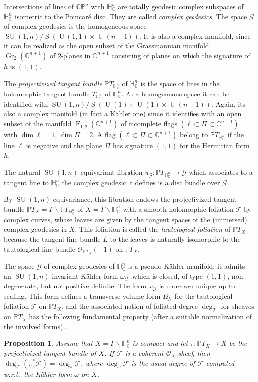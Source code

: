 \documentclass[JEP,XML,SOM,Unicode,NoFloatCountersInSection]{cedram}
\let\mathcal\mathscr
\newcommand{\citestar}[3]{\cite[#3]{#1}}
\theoremstyle{plain}
\newtheorem{prop}[theo]{Proposition}
\theoremstyle{definition}
\DeclareMathOperator{\rF}{F}
\DeclareMathOperator{\Gr}{Gr}
\DeclareMathOperator{\rS}{S}
\DeclareMathOperator{\SU}{SU}
\DeclareMathOperator{\rU}{U}
\newcommand{\cF}{\mathcal{F}}
\newcommand{\cG}{\mathcal{G}}
\newcommand{\cO}{\mathcal{O}}
\newcommand{\cT}{\mathcal{T}}
\newcommand{\bC}{\mathbb{C}}
\newcommand{\bCP}{\mathbb{CP}}
\newcommand{\HC}{{\mathbb{H}^n_\mathbb{C}}}
\newcommand{\THC}{T_{\HC}}
\newcommand{\PTX}{{\mathbb{P}T_X}}
\newcommand{\PTH}{\mathbb{P}T_{\mathbb{H}^n_\mathbb{C}}}
\newcommand{\OX}{\mathcal{O}_{\PTX}(-1)}
\begin{document}
Intersections of lines
of $\bCP^n$ with $\HC$ are totally geodesic complex subspaces of~$\HC$ isometric to the Poincaré
disc. They are called \emph{complex geodesics}. The space $\cG$ of complex geodesics is the
homogeneous space $\SU(1,n)/\rS(\rU(1,1)\times \rU(n-1))$. It is also a complex manifold, since it
can be realized as the open subset of the Grassmannian manifold $\Gr_2(\bC^{n+1})$ of
$2$-planes in $\bC^{n+1}$ consisting of planes on which the signature of $h$ is $(1,1)$.

The \emph{projectivized tangent bundle} $\PTH$ of $\HC$ is the space of lines in the holomorphic
tangent bundle $\THC$ of $\HC$. As a homogeneous space it can be identified with
$\SU(1,n)/\rS(\rU(1)\times\rU(1)\times \rU(n-1))$. Again, its also a complex manifold (in fact a Kähler one)
since it identifies with an open subset of the manifold $\rF_{1,2}(\bC^{n+1})$
of incomplete flags $(\ell\subset\Pi\subset\bC^{n+1})$ with
$\dim \ell=1$, $ \dim\Pi=2$. A flag $(\ell\subset\Pi\subset\bC^{n+1})$ belong to $\PTH$ if the line
$\ell$ is negative and the plane $\Pi$ has signature $(1,1)$ for the Hermitian form $h$.

The natural $\SU(1,n)$-equivariant fibration $\pi_{\cG}:\PTH\to\cG$ which associates
to a tangent line to $\HC$ the complex geodesic it defines is a
disc bundle over $\cG$.

By $\SU(1,n)$-equivariance, this fibration endows the projectivized tangent bundle
$\PTX=\Gamma\backslash\PTH$ of $X=\Gamma\backslash\HC$ with a smooth holomorphic foliation $\cT$ by
complex curves, whose
leaves are given by the tangent spaces of the (immersed) complex geodesics in $X$. This foliation is
called the \emph{tautological foliation} of $\PTX$ because the tangent line bundle $L$ to the leaves is
naturally isomorphic to the tautological line bundle $\OX$ on $\PTX$.

The space $\cG$ of complex geodesics of $\HC$ is a pseudo-Kähler manifold: it admits an
$\SU(1,n)$-invariant Kähler form $\omega_{\cG}$, which is closed, of type $(1,1)$, non degenerate,
but not positive definite. The form $\omega_{\cG}$ is moreover unique up to scaling. This form
defines a transverse volume form $\Omega_{\cG}$
for the tautological foliation $\cT$ on $\PTX$, and the associated notion of foliated degree
$\deg_\cT$ for sheaves on $\PTX$ has the following fundamental property (after a suitable
normalization of the involved forms)
\citestar{KM}*{Prop.\,3.1}.

\begin{prop}\label{prop:degT}
Assume that $X=\Gamma\backslash\HC$ is compact and let $\pi:\PTX\to X$ be the projectivized tangent
bundle of $X$. If
$\cF$ is a coherent $\cO_X$-sheaf, then $\deg_\cT(\pi^*\cF)=\deg_\omega\cF$, where $\deg_\omega\cF$ is the usual
degree of $\cF$ computed w.r.t.\ the Kähler form $\omega$ on $X$.
\end{prop}
\end{document}
